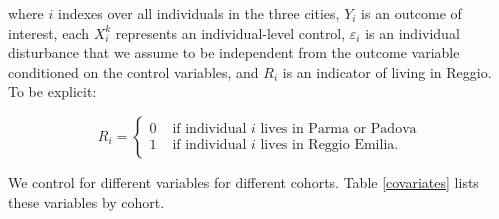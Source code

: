 \documentclass{article}
\begin{document}
\noindent where $i$ indexes over all individuals in the three cities, $Y_{i}$ is an outcome of interest, each $X_{i}^k$ represents an individual-level control, $\varepsilon_{i}$ is an individual disturbance that we assume to be independent from the outcome variable conditioned on the control variables, and $R_{i}$ is an indicator of living in Reggio. To be explicit:

\begin{equation}\label{explain-R}
	R_i = 
	\begin{cases}
		0 & \text{ if individual } i \text{ lives in Parma or Padova} \\
		1 & \text{ if individual } i \text{ lives in Reggio Emilia}.
	\end{cases}
\end{equation}

We control for different variables for different cohorts. Table \ref{covariates} lists these variables by cohort.
\end{document}
